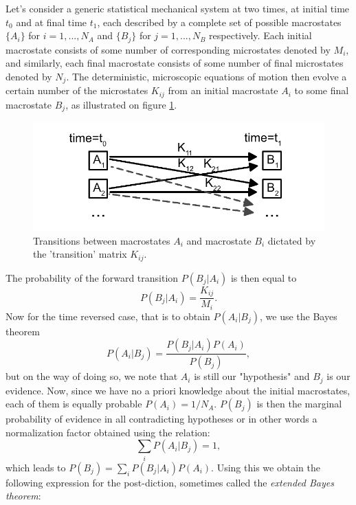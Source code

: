 \documentclass[a4paper,12pt]{article}
\begin{document}
Let's consider a generic statistical mechanical system at two times, at initial time $t_0$ and at final time $t_1$, each described by a complete set of possible macrostates $\{A_i\}$ for $ i=1,...,N_A $ and $\{B_j\}$ for $ j=1,...,N_B $  respectively. Each initial macrostate consists of some number of corresponding microstates denoted by $M_i$, and similarly, each final macrostate consists of some number of final microstates denoted by $N_j$. The deterministic, microscopic equations of motion then evolve a certain number of the microstates $K_{ij}$ from an initial macrostate $A_i$ to some final macrostate $B_j$, as illustrated on figure \ref{Fig4}.
\begin{figure}[ht!]
\centering \includegraphics[width=15cm]{figure4} 
\caption{Transitions between macrostates ${A_i}$ and macrostate ${B_i}$ dictated by the 'transition' matrix $K_{ij}$.}
\label{Fig4} 
\end{figure}
The probability of the forward transition $P(B_j|A_i)$ is then equal to
\begin{equation}
  P(B_j|A_i)= \frac{K_{ij}}{M_i}.
\end{equation}
Now for the time reversed case, that is to obtain $P(A_i|B_j)$, we use the Bayes theorem
\begin{equation}
  P(A_i|B_j)=\frac{P(B_j|A_i)P(A_i)}{P(B_j)},
\end{equation}
but on the way of doing so, we note that $A_i$ is still our "hypothesis" and $B_j$ is our evidence. Now, since we have no a priori knowledge about the initial macrostates, each of them is equally probable $P(A_i)= 1/N_A$.
$P(B_j)$ is then the marginal probability of evidence in all contradicting hypotheses or in other words a normalization factor obtained using the relation:
\begin{equation}
  \sum_i P(A_i|B_j) = 1,
\end{equation}
which leads to $P(B_j) = \sum_i P(B_j|A_i)P(A_i)$. Using this we obtain the following expression for the post-diction, sometimes called the \textit{extended Bayes theorem}:
\end{document}
